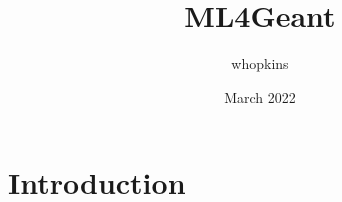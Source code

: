 \documentclass{article}
\title{ML4Geant}
\author{whopkins }
\date{March 2022}
\begin{document}
\maketitle

\section{Introduction}
\end{document}
